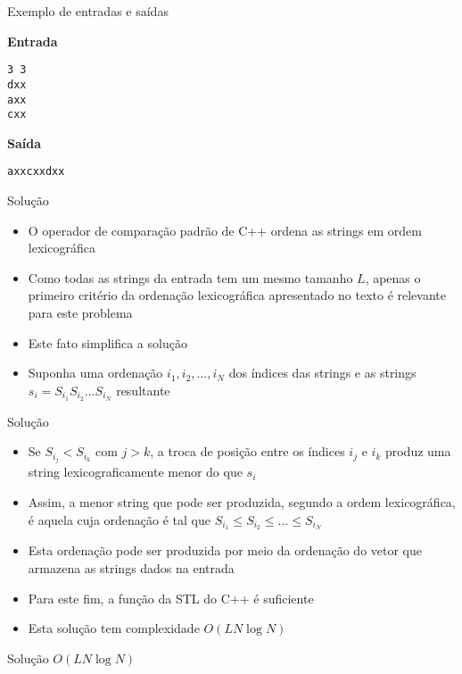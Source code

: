\begin{frame}[fragile]{Exemplo de entradas e saídas}

\begin{minipage}[t]{0.45\textwidth}
\textbf{Entrada}
\begin{verbatim}
3 3
dxx
axx
cxx
\end{verbatim}
\end{minipage}
\begin{minipage}[t]{0.5\textwidth}
\textbf{Saída}
\begin{verbatim}
axxcxxdxx
\end{verbatim}
\end{minipage}
\end{frame}

\begin{frame}[fragile]{Solução}

    \begin{itemize}
        \item O operador de comparação padrão de C++ ordena as strings em ordem lexicográfica

        \item Como todas as strings da entrada tem um mesmo tamanho $L$, apenas o primeiro critério
            da ordenação lexicográfica apresentado no texto é relevante para este problema

        \item Este fato simplifica a solução

        \item Suponha uma ordenação $i_1, i_2, \ldots, i_N$ dos índices das strings e as strings
            $s_i = S_{i_1}S_{i_2}\ldots S_{i_N}$ resultante

    \end{itemize}

\end{frame}

\begin{frame}[fragile]{Solução}

    \begin{itemize}
        \item Se $S_{i_j} < S_{i_k}$ com $j > k$, a troca de posição entre os índices $i_j$ e
            $i_k$ produz uma string lexicograficamente menor do que $s_i$

        \item Assim, a menor string que pode ser produzida, segundo a ordem lexicográfica, é 
            aquela cuja ordenação é tal que $S_{i_1} \leq S_{i_2} \leq \ldots \leq S_{i_N}$ 

        \item Esta ordenação pode ser produzida por meio da ordenação do vetor que armazena as 
            strings dados na entrada

        \item Para este fim, a função  da STL do C++ é suficiente

        \item Esta solução tem complexidade $O(LN\log N)$
    \end{itemize}

\end{frame}

\begin{frame}[fragile]{Solução $O(LN\log N)$}
\end{frame}
